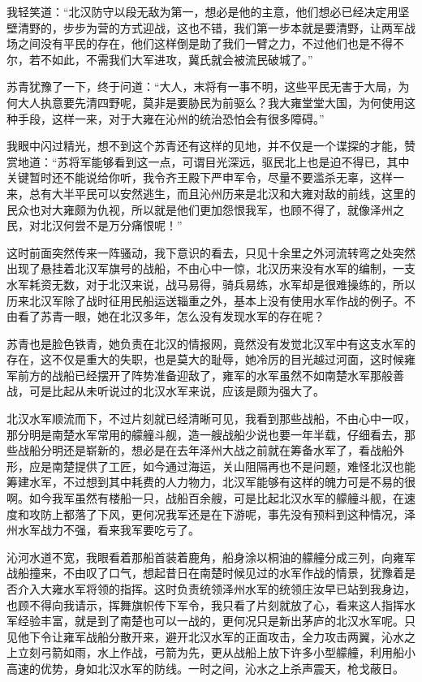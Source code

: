 我轻笑道：“北汉防守以段无敌为第一，想必是他的主意，他们想必已经决定用坚壁清野的，步步为营的方式迎战，这也不错，我们第一步本就是要清野，让两军战场之间没有平民的存在，他们这样倒是助了我们一臂之力，不过他们也是不得不尔，若不如此，不需我们大军进攻，冀氏就会被流民破城了。”

苏青犹豫了一下，终于问道：“大人，末将有一事不明，这些平民无害于大局，为何大人执意要先清四野呢，莫非是要胁民为前驱么？我大雍堂堂大国，为何使用这种手段，这样一来，对于大雍在沁州的统治恐怕会有很多障碍。”

我眼中闪过精光，想不到这个苏青还有这样的见地，并不仅是一个谍探的才能，赞赏地道：“苏将军能够看到这一点，可谓目光深远，驱民北上也是迫不得已，其中关键暂时还不能说给你听，我令齐王殿下严申军令，尽量不要滥杀无辜，这样一来，总有大半平民可以安然逃生，而且沁州历来是北汉和大雍对敌的前线，这里的民众也对大雍颇为仇视，所以就是他们更加怨恨我军，也顾不得了，就像泽州之民，对北汉何尝不是万分痛恨呢！”

这时前面突然传来一阵骚动，我下意识的看去，只见十余里之外河流转弯之处突然出现了悬挂着北汉军旗号的战船，不由心中一惊，北汉历来没有水军的编制，一支水军耗资无数，对于北汉来说，战马易得，骑兵易练，水军却是很难操练的，所以历来北汉军除了战时征用民船运送辎重之外，基本上没有使用水军作战的例子。不由看了苏青一眼，她在北汉多年，怎么没有发现水军的存在呢？

苏青也是脸色铁青，她负责在北汉的情报网，竟然没有发觉北汉军中有这支水军的存在，这不仅是重大的失职，也是莫大的耻辱，她冷厉的目光越过河面，这时候雍军前方的战船已经摆开了阵势准备迎敌了，雍军的水军虽然不如南楚水军那般善战，可是比起从未听说过的北汉水军来说，应该是颇为强大了。

北汉水军顺流而下，不过片刻就已经清晰可见，我看到那些战船，不由心中一叹，那分明是南楚水军常用的艨艟斗舰，造一艘战船少说也要一年半载，仔细看去，那些战船分明还是崭新的，想必是在去年泽州大战之前就在筹备水军了，看战船外形，应是南楚提供了工匠，如今通过海运，关山阻隔再也不是问题，难怪北汉也能筹建水军，不过想到其中耗费的人力物力，北汉军能够有这样的魄力可是不易的很啊。如今我军虽然有楼船一只，战船百余艘，可是比起北汉水军的艨艟斗舰，在速度和攻防上都落了下风，更何况我军还是在下游呢，事先没有预料到这种情况，泽州水军战力不强，看来我军要吃亏了。

沁河水道不宽，我眼看着那船首装着鹿角，船身涂以桐油的艨艟分成三列，向雍军战船撞来，不由叹了口气，想起昔日在南楚时候见过的水军作战的情景，犹豫着是否介入大雍水军将领的指挥。这时负责统领泽州水军的统领庄汝早已站到我身边，也顾不得向我请示，挥舞旗帜传下军令，我只看了片刻就放了心，看来这人指挥水军经验丰富，就是到了南楚也可以一战的，更何况只是新出茅庐的北汉水军呢。只见他下令让雍军战船分散开来，避开北汉水军的正面攻击，全力攻击两翼，沁水之上立刻弓箭如雨，水上作战，弓箭为先，更从战船上放下许多小型艨艟，利用船小高速的优势，身如北汉水军的防线。一时之间，沁水之上杀声震天，枪戈蔽日。

